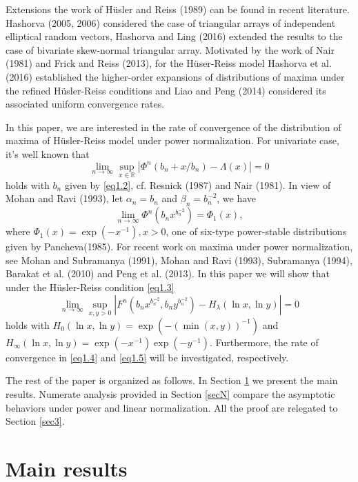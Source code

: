 \documentclass[10pt,twosided]{article}
\numberwithin{equation}{section}
\numberwithin{equation}{section}
\newcommand{\R}{\mathbb{R}}
\newcommand{\inr}{\in \R}
\begin{document}
Extensions the work of H\"{u}sler and Reiss (1989) can be found in
recent literature. Hashorva (2005, 2006) considered the case of
triangular arrays of independent elliptical random vectors, Hashorva
and Ling (2016) extended the results to the case of bivariate
skew-normal triangular array. Motivated by the work of Nair (1981)
and Frick and Reiss (2013), for the H\"{u}ser-Reiss model Hashorva
et al. (2016) established the higher-order expansions of
distributions of maxima under the refined H\"{u}sler-Reiss
conditions and Liao and Peng (2014) considered its associated
uniform convergence rates.

In this paper, we are interested in the rate of convergence of the
distribution of maxima of H\"{u}sler-Reiss model under power
normalization. For univariate case, it's well known that
$$\lim_{n\to \infty}\sup_{x\inr}|\Phi^n(b_n+x/b_n)-\Lambda(x)|=0$$
holds with $b_n$ given by \eqref{eq1.2}, cf. Resnick (1987) and Nair
(1981). In view of Mohan and Ravi (1993), let $\alpha_n=b_n$ and
$\beta_n=b_n^{-2}$, we have
\begin{equation}\label{eq1.4}
\lim_{n\to \infty}\Phi^n(b_nx^{b_n^{-2}})=\Phi_{1}(x),
\end{equation}
where $\Phi_{1}(x)=\exp\left(-x^{-1}\right), x>0$, one of six-type power-stable
distributions given by Pancheva(1985). For recent work on maxima
under power normalization, see Mohan and Subramanya (1991), Mohan and
Ravi (1993), Subramanya (1994), Barakat et al. (2010) and Peng et
al. (2013). In this paper we will show that under the
H\"{u}sler-Reiss condition \eqref{eq1.3}
\begin{equation}\label{eq1.5}
\lim_{n\to \infty}\sup_{x,y>0}|F^n(b_nx^{b_n^{-2}},b_ny^{b_n^{-2}})-H_{\lambda}(\ln x, \ln y)|=0
\end{equation}
holds with $H_0(\ln x,\ln y)=\exp\left(-(\min(x,y))^{-1}\right)$ and
$H_{\infty}(\ln x,\ln y)=\exp\left(-x^{-1}\right)\exp\left(-y^{-1}\right)$. Furthermore,  the
rate of convergence in \eqref{eq1.4} and \eqref{eq1.5} will be
investigated, respectively.


The rest of the paper is organized as follows. In Section \ref{sec2}
we present the main results. Numerate analysis provided in Section \ref{secN}
compare the asymptotic behaviors under power and linear normalization.
All the proof are relegated to Section
\ref{sec3}.


\section{Main results}\label{sec2}
\end{document}
